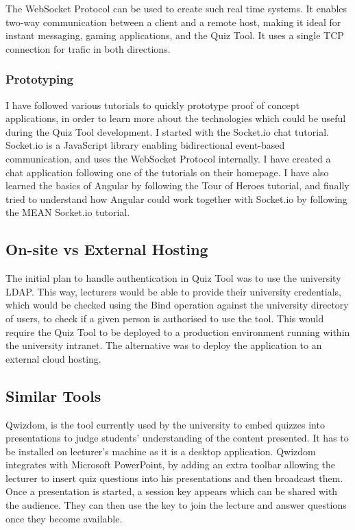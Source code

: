 The WebSocket Protocol can be used to create such real time systems. It enables two-way
communication between a client and a remote host, making it ideal for instant messaging,
gaming applications, and the Quiz Tool. It uses a single TCP connection for trafic
in both directions\cite{11}.

\subsubsection{Prototyping}
I have followed various tutorials to quickly prototype proof of concept applications,
in order to learn more about the technologies which could be useful during the Quiz Tool
development. I started with the Socket.io chat tutorial. Socket.io is
a JavaScript library enabling bidirectional event-based communication, and uses
the WebSocket Protocol internally\cite{12}. I have created a chat application following one
of the tutorials on their homepage\cite{13}. I have also learned the basics of
Angular by following the Tour of Heroes tutorial\cite{14}, and finally tried to
understand how Angular could work together with Socket.io by following the MEAN
Socket.io tutorial\cite{15}.

\subsection{On-site vs External Hosting}
The initial plan to handle authentication in Quiz Tool was to use the university
LDAP\cite{17}. This way, lecturers would be able to provide their university credentials,
which would be checked using the Bind operation against the university directory of users,
to check if a given person is authorised to use the tool. This would require the Quiz Tool
to be deployed to a production environment running within the university intranet. The
alternative was to deploy the application to an external cloud hosting.

\subsection{Similar Tools}
Qwizdom\cite{1}, is the tool currently used by the university to embed quizzes into
presentations to judge students' understanding of the content presented. It has to be
installed on lecturer's machine as it is a desktop application. Qwizdom integrates
with Microsoft PowerPoint\cite{16}, by adding an extra toolbar allowing the lecturer
to insert quiz questions into his presentations and then broadcast them. Once
a presentation is started, a session key appears which can be shared with the audience.
They can then use the key to join the lecture and answer questions once they become available.

